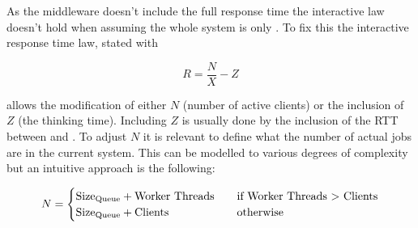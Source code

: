 
        As the middleware doesn't include the full response time the interactive law doesn't hold when assuming the
        whole system is only \mw{} \textendash{} \srv. To fix this the interactive response time law, stated with

        $$ R = \frac{N}{X} - Z $$

        allows the modification of either $N$ (number of active clients) or the inclusion of $Z$ (the thinking time).
        Including $Z$ is usually done by the inclusion of the RTT between \srv{} and \mw{}. To adjust $N$ it is relevant
        to define what the number of actual jobs are in the current system. This can be modelled to various degrees of
        complexity but an intuitive approach is the following:

        $$
        N =
        \begin{cases}
            \text{Size\textsubscript{Queue}} + \text{Worker Threads}   & \quad \text{if Worker Threads > Clients} \\
            \text{Size\textsubscript{Queue}} + \text{Clients}          & \quad \text{otherwise}
        \end{cases}
        $$


